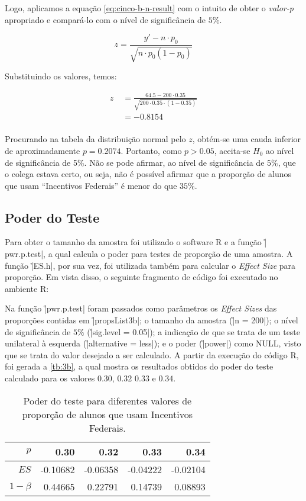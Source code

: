 Logo, aplicamos a equação \ref{eq:cinco-b-n-result} com o intuito de obter o \textit{valor-p} 
apropriado e compará-lo com o nível de significância de $5\%$.

\begin{equation}
  \label{eq:cinco-b-n-result}
  z = \frac{y' - n \cdot p_0}{ \sqrt{n \cdot p_0 (1 - p_0)} }
\end{equation}

Substituindo os valores, temos:

\begin{align*}
  z &\;= \frac{64.5 - 200 \cdot 0.35}{ \sqrt{200 \cdot 0.35 \cdot (1 - 0.35)} } \\
    &\;= - 0.8154 \nonumber \\
\end{align*}

Procurando na tabela da distribuição normal pelo $z$, 
obtém-se uma cauda inferior de aproximadamente $p = 0.2074$.
Portanto, como $p > 0.05$, aceita-se $H_0$ ao nível de significância de 5\%. 
Não se pode afirmar, ao nível de significância de $5\%$, que o colega estava certo, ou seja, 
não é possível afirmar que a proporção de  alunos que usam ``Incentivos Federais'' é menor do que $35\%$.


\subsection{Poder do Teste}
\label{questao:3b}

Para obter o tamanho da amostra foi utilizado o software R e a função \r|pwr.p.test|, a qual calcula o poder para testes de proporção de uma amostra.
A função \r|ES.h|, por sua vez, foi utilizada também para calcular o \textit{Effect Size} para proporção.
Em vista disso, o seguinte fragmento de código foi executado no ambiente R:


Na função \r|pwr.p.test| foram passados como parâmetros os \textit{Effect Sizes} das proporções contidas em \r|propsList3b|;
o tamanho da amostra (\r|n = 200|); 
o nível de significância de $5\%$ (\r|sig.level = 0.05|);
a indicação de que se trata de um teste unilateral à esquerda (\r|alternative = less|); 
e o poder (\r|power|) como NULL, visto que se trata do valor desejado a ser calculado.
A partir da execução do código R, foi gerada a \autoref{tb:3b}, a qual mostra os resultados obtidos do poder do teste calculado para os valores $0.30$, $0.32$ $0.33$ e $0.34$.

\begin{table}[ht]
\centering
\caption{Poder do teste para diferentes valores de proporção de alunos que usam Incentivos Federais.} 
\label{tb:3b}
\begin{tabular}{rrrrr}
  \toprule
 $p$ & 0.30 & 0.32 & 0.33 & 0.34 \\ 
  \midrule
$ES$ 	& -0.10682 & -0.06358 & -0.04222 & -0.02104 \\ 
$1 - \beta$ & 0.44665   & 0.22791   & 0.14739   & 0.08893  \\ 
   \bottomrule
\end{tabular}
\end{table}

